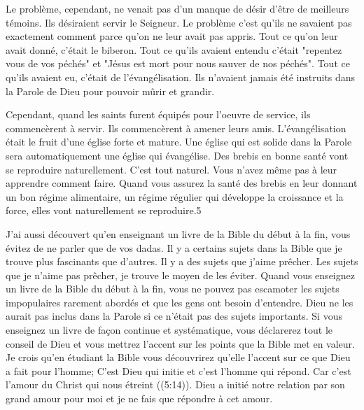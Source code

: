 Le problème, cependant, ne venait pas d’un manque de désir d’être de meilleurs témoins. Ils désiraient servir le
Seigneur. Le problème c’est qu’ils ne savaient pas exactement comment parce qu’on ne leur avait pas appris. Tout ce
qu’on leur avait donné, c’était le biberon. Tout ce qu’ils avaient entendu c’était "repentez vous de vos péchés" et
"Jésus est mort pour nous sauver de nos péchés". Tout ce qu’ils avaient eu, c’était de l’évangélisation. Ils n’avaient
jamais été instruits dans la Parole de Dieu pour pouvoir mûrir et grandir.

Cependant, quand les saints furent équipés pour l’oeuvre de service, ils commencèrent à servir. Ils commencèrent à
amener leurs amis. L’évangélisation était le fruit d’une église forte et mature. Une église qui est solide dans la Parole
sera automatiquement une église qui évangélise. Des brebis en bonne santé vont se reproduire naturellement. C’est
tout naturel. Vous n’avez même pas à leur apprendre comment faire. Quand vous assurez la santé des brebis en leur
donnant un bon régime alimentaire, un régime régulier qui développe la croissance et la force, elles vont
naturellement se reproduire.5

J’ai aussi découvert qu’en enseignant un livre de la Bible du début à la fin, vous évitez de ne parler que de vos
dadas. Il y a certains sujets dans la Bible que je trouve plus fascinants que d’autres. Il y a des sujets que j’aime
prêcher. Les sujets que je n’aime pas prêcher, je trouve le moyen de les éviter. Quand vous enseignez un livre de la
Bible du début à la fin, vous ne pouvez pas escamoter les sujets impopulaires rarement abordés et que les gens ont
besoin d’entendre. Dieu ne les aurait pas inclus dans la Parole si ce n’était pas des sujets importants. Si vous
enseignez un livre de façon continue et systématique, vous déclarerez tout le conseil de Dieu et vous mettrez l’accent
sur les points que la Bible met en valeur. Je crois qu’en étudiant la Bible vous découvrirez qu'elle l'accent sur ce que
Dieu a fait pour l’homme; C'est Dieu qui initie et c'est l'homme qui répond. Car c’est l’amour du Christ qui nous étreint
((5:14)). Dieu a initié notre relation par son grand amour pour moi et je ne fais que répondre à cet
amour.

